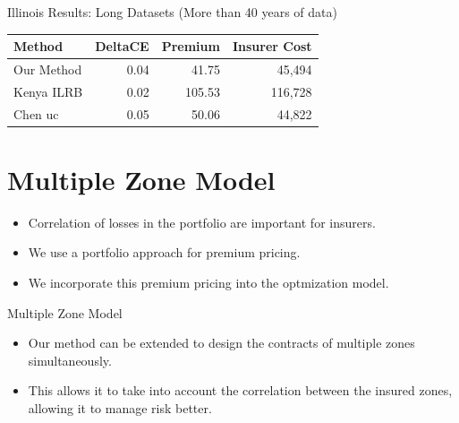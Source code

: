 \documentclass{beamer}
\begin{document}
\begin{frame}{Illinois Results: Long Datasets (More than 40 years of data)}
    \begin{table}
        \begin{tabular}{lrrr}
            \toprule
                  Method &  DeltaCE &  Premium &  Insurer Cost \\
            \midrule
            Our Method &     0.04 &    41.75 &             45,494 \\
               Kenya ILRB &     0.02 &   105.53 &            116,728 \\
                 Chen uc &     0.05 &    50.06 &            44,822 \\
            \bottomrule
            \end{tabular}
    \end{table}
\end{frame}

\section{Multiple Zone Model}
\begin{frame}
    \begin{itemize}
        \setlength\itemsep{2em}
        \item Correlation of losses in the portfolio are important for insurers. 
        \item We use a portfolio approach for premium pricing. 
        \item We incorporate this premium pricing into the optmization model. 
    \end{itemize}
\end{frame}

\begin{frame}{Multiple Zone Model}
    \begin{itemize}
        \setlength\itemsep{2em}
        \item Our method can be extended to design the contracts of multiple zones simultaneously. 
        \item This allows it to take into account the correlation between the insured zones, allowing it to manage risk better. 
    \end{itemize}
    \end{frame}
    
\end{document}
